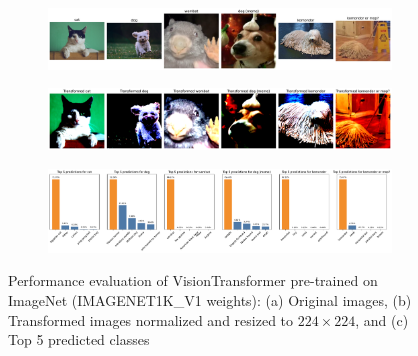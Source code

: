 \begin{figure}[H]
    \centering
    \begin{subfigure}{0.95\textwidth}
        \includegraphics[width=\textwidth]{original_images_vit}
        \caption{}
        \label{subfig:original_images_vit}
    \end{subfigure}
    \begin{subfigure}{0.95\textwidth}
        \includegraphics[width=\textwidth]{transformed_images_vit}
        \caption{}
        \label{subfig:transformed_images_vit}
    \end{subfigure}
    \begin{subfigure}{0.95\textwidth}
        \includegraphics[width=\textwidth]{prediction_plots_vit}
        \caption{}
        \label{subfig:prediction_plots_vit}
    \end{subfigure}
    \caption{Performance evaluation of VisionTransformer pre-trained on ImageNet (IMAGENET1K\_V1 weights): (a) Original images, (b) Transformed images normalized and resized to $224 \times 224$, and (c) Top 5 predicted classes}
    \label{fig:vit_scratch}
\end{figure}


